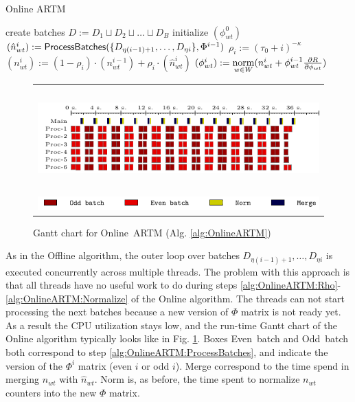 \documentclass[russian,english]{llncs}
\newcommand{\norm}{\mathop{\rm norm}\limits}
\newcommand{\kw}[1]{\mbox{\textsf{#1}}}
\begin{document}
\SetAlgoSkip{}
\begin{algorithm2e}[t]
	\caption{Online ARTM} %
	\label{alg:OnlineARTM}
	\BlankLine
	\BlankLine
	create batches $D := D_1 \sqcup D_2 \sqcup \dots \sqcup D_B$\;
	initialize $(\phi^0_{wt})$\;
	 {
		$(\hat n^i_{wt}) := \kw{ProcessBatches}(\{D_{\eta (i - 1) + 1}, \dots, D_{\eta i}\}, \Phi^{i - 1})$\;
		\label{alg:OnlineARTM:ProcessBatches}
		$\rho_i := (\tau_0 + i)^{-\kappa}$\;
		\label{alg:OnlineARTM:Rho}
		$(n^{i}_{wt}) := (1 - \rho_i) \cdot (n^{i-1}_{wt}) + \rho_i \cdot (\hat n^{i}_{wt})$\;
		\label{alg:OnlineARTM:Merge}
		$(\phi^{i}_{wt}) := \norm_{w \in W} (n^{i}_{wt} + \phi^{i - 1}_{wt} \frac{\partial R}{\partial \phi_{wt}})$\;
		\label{alg:OnlineARTM:Normalize}
	}
\end{algorithm2e}
\begin{figure}[t!]
	\centering
	\begin{tabular}{c}
		\includegraphics[height=4cm, width=12cm]{plots/online.pdf} \\
		\includegraphics[scale=1]{plots/legend_online.pdf}
	\end{tabular}
	\caption{Gantt chart for \kw{Online ARTM} (Alg. \ref{alg:OnlineARTM})} \label{fig:gantt:OnlineARTM}
\end{figure}

As in the \kw{Offline} algorithm, the outer loop over batches
$D_{\eta (i - 1) + 1}, \dots, D_{\eta i}$ is executed concurrently across multiple threads.
The problem with this approach is that all threads have no useful work to do during steps
\ref{alg:OnlineARTM:Rho}-\ref{alg:OnlineARTM:Normalize} of the \kw{Online} algorithm.
The threads can not start processing the next batches because a new version of $\Phi$ matrix is not ready yet.
As a result the CPU utilization stays low, and the run-time Gantt chart of the \kw{Online} algorithm typically looks like in Fig. \ref{fig:gantt:OnlineARTM}.
Boxes \kw{Even batch} and \kw{Odd batch} both correspond to step \ref{alg:OnlineARTM:ProcessBatches},
and indicate the version of the $\Phi^i$ matrix (even $i$ or odd $i$).
\kw{Merge} correspond to the time spend in merging $n_{wt}$ with $\hat n_{wt}$.
\kw{Norm} is, as before, the time spent to normalize $n_{wt}$ counters into the new $\Phi$ matrix.
\end{document}
